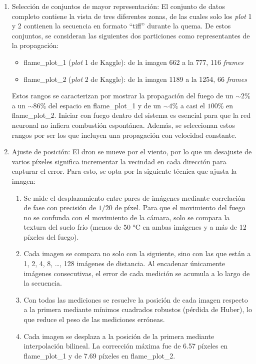 \begin{enumerate}
	\item Selección de conjuntos de mayor representación: El conjunto de datos completo contiene la vista de tres diferentes zonas, de las cuales solo los \textit{plot} 1 y 2 contienen la secuencia en formato ``tiff'' durante la quema. De estos conjuntos, se consideran las siguientes dos particiones como representantes de la propagación:

	\begin{itemize}
		\item flame\_plot\_1 (\textit{plot} 1 de Kaggle): de la imagen 662 a la 777, 116 \textit{frames}
		\item flame\_plot\_2 (\textit{plot} 2 de Kaggle): de la imagen 1189 a la 1254, 66 \textit{frames}
	\end{itemize}
	
	Estos rangos se caracterizan por mostrar la propagación del fuego de un $\sim 2\%$ a un $\sim 86\%$ del espacio en flame\_plot\_1 y de un $\sim 4\%$ a casi el $100\%$ en flame\_plot\_2. Iniciar con fuego dentro del sistema es esencial para que la red neuronal no infiera combustión espontánea. Además, se seleccionan estos rangos por ser los que incluyen una propagación con velocidad constante. 

	\item Ajuste de posición: El dron se mueve por el viento, por lo que un desajuste de varios píxeles significa incrementar la vecindad en cada dirección para capturar el error. Para esto, se opta por la siguiente técnica que ajusta la imagen:

	\begin{enumerate}
		\item Se mide el desplazamiento entre pares de imágenes mediante correlación de fase con precisión de $1/20$ de píxel. Para que el movimiento del fuego no se confunda con el movimiento de la cámara, solo se compara la textura del suelo frío (menos de 50 °C en ambas imágenes y a más de 12 píxeles del fuego).
		\item Cada imagen se compara no solo con la siguiente, sino con las que están a 1, 2, 4, 8, \dots, 128 imágenes de distancia. Al encadenar únicamente imágenes consecutivas, el error de cada medición se acumula a lo largo de la secuencia.
		\item Con todas las mediciones se resuelve la posición de cada imagen respecto a la primera mediante mínimos cuadrados robustos (pérdida de Huber), lo que reduce el peso de las mediciones erróneas.
		\item Cada imagen se desplaza a la posición de la primera mediante interpolación bilineal. La corrección máxima fue de 6.57 píxeles en flame\_plot\_1 y de 7.69 píxeles en flame\_plot\_2.
	\end{enumerate}


\end{enumerate}
